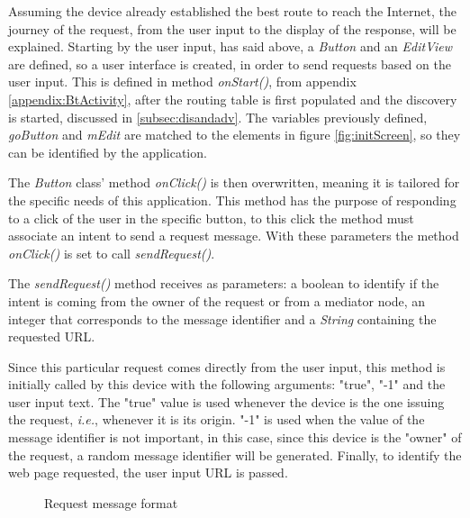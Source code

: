 Assuming the device already established the best route to reach the Internet, the journey of the request, from the user input to the display of the response, will be explained. Starting by the user input, has said above, a \textit{Button} and an \textit{EditView} are defined, so a user interface is created, in order to send requests based on the user input. This is defined in method \textit{onStart()}, from appendix \ref{appendix:BtActivity}, after the routing table is first populated and the discovery is started, discussed in \ref{subsec:disandadv}. The variables previously defined, \textit{goButton} and \textit{mEdit} are matched to the elements in figure \ref{fig:initScreen}, so they can be identified by the application.

The \textit{Button} class' method \textit{onClick()} is then overwritten, meaning it is tailored for the specific needs of this application. This method has the purpose of responding to a click of the user in the specific button, to this click the method must associate an intent to send a request message. With these parameters the method \textit{onClick()} is set to call \textit{sendRequest()}.

The \textit{sendRequest()} method receives as parameters: a boolean to identify if the intent is coming from the owner of the request or from a mediator node, an integer that corresponds to the message identifier and a \textit{String} containing the requested \gls{URL}.

Since this particular request comes directly from the user input, this method is initially called by this device with the following arguments: "true", "-1" and the user input text. The "true" value is used whenever the device is the one issuing the request, \textit{i.e.}, whenever it is its origin. "-1" is used when the value of the message identifier is not important, in this case, since this device is the "owner" of the request, a random message identifier will be generated. Finally, to identify the web page requested, the user input \gls{URL} is passed.

\begin{figure}[ht]
   \noindent{}
	\caption{\label{fig:rqtmsg} Request message format}
\end{figure}

